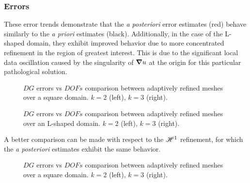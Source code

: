 \newpage
\subsubsection{Errors}

These error trends demonstrate that the \textit{a posteriori} error estimates (red) behave similarly to the \textit{a priori} estimates (black). Additionally, in the case of the L-shaped domain, they exhibit improved behavior due to more concentrated refinement in the region of greatest interest. This is due to the significant local data oscillation caused by the singularity of $\bm{\nabla} u$ at the origin for this particular pathological solution.

\begin{figure}[!ht]
	\begin{subfigure}[b]{0.45\textwidth}
		
	\end{subfigure}
	\hfill
	\begin{subfigure}[b]{0.45\textwidth}
		
	\end{subfigure}
    \caption{$DG$ errors vs $DOFs$ comparison between adaptively refined meshes over a square domain. $k = 2$ (left), $k = 3$ (right).}
\end{figure}

\begin{figure}[!ht]
	\begin{subfigure}[b]{0.45\textwidth}
		
	\end{subfigure}
	\hfill
	\begin{subfigure}[b]{0.45\textwidth}
	\end{subfigure}
    \caption{$DG$ errors vs $DOFs$ comparison between adaptively refined meshes over an L-shaped domain. $k = 2$ (left), $k = 3$ (right).}
\end{figure}

\newpage

A better comparison can be made with respect to the $\mathscr{H}^1$ refinement, for which the \textit{a posteriori} estimates exhibit the same behavior.

\begin{figure}[!ht]
	\begin{subfigure}[b]{0.45\textwidth}
		
	\end{subfigure}
	\hfill
	\begin{subfigure}[b]{0.45\textwidth}
		
	\end{subfigure}
    \caption{$DG$ errors vs $DOFs$ comparison between adaptively refined meshes over a square domain. $k = 2$ (left), $k = 3$ (right).}
\end{figure}

